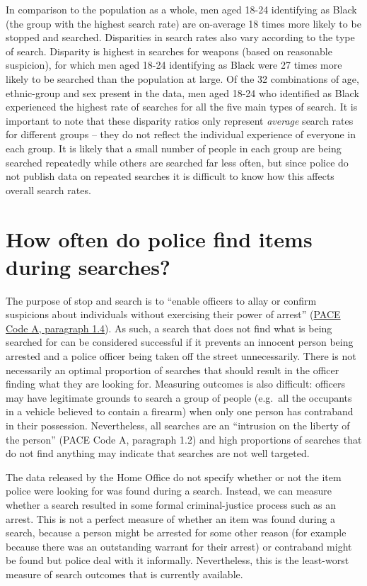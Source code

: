 \documentclass[
  a4paper,
  twoside, 11pt]{article}
\begin{document}
In comparison to the population as a whole, men aged 18-24 identifying as Black (the group with the highest search rate) are on-average 18 times more likely to be stopped and searched. Disparities in search rates also vary according to the type of search. Disparity is highest in searches for weapons (based on reasonable suspicion), for which men aged 18-24 identifying as Black were 27 times more likely to be searched than the population at large. Of the 32 combinations of age, ethnic-group and sex present in the data, men aged 18-24 who identified as Black experienced the highest rate of searches for all the five main types of search. It is important to note that these disparity ratios only represent \emph{average} search rates for different groups -- they do not reflect the individual experience of everyone in each group. It is likely that a small number of people in each group are being searched repeatedly while others are searched far less often, but since police do not publish data on repeated searches it is difficult to know how this affects overall search rates.

\hypertarget{how-often-do-police-find-items-during-searches}{%
\section{How often do police find items during searches?}\label{how-often-do-police-find-items-during-searches}}

The purpose of stop and search is to ``enable officers to allay or confirm suspicions about individuals without exercising their power of arrest'' (\href{https://www.gov.uk/guidance/police-and-criminal-evidence-act-1984-pace-codes-of-practice}{PACE Code A, paragraph 1.4}). As such, a search that does not find what is being searched for can be considered successful if it prevents an innocent person being arrested and a police officer being taken off the street unnecessarily. There is not necessarily an optimal proportion of searches that should result in the officer finding what they are looking for. Measuring outcomes is also difficult: officers may have legitimate grounds to search a group of people (e.g.~all the occupants in a vehicle believed to contain a firearm) when only one person has contraband in their possession. Nevertheless, all searches are an ``intrusion on the liberty of the person'' (PACE Code A, paragraph 1.2) and high proportions of searches that do not find anything may indicate that searches are not well targeted.

The data released by the Home Office do not specify whether or not the item police were looking for was found during a search. Instead, we can measure whether a search resulted in some formal criminal-justice process such as an arrest. This is not a perfect measure of whether an item was found during a search, because a person might be arrested for some other reason (for example because there was an outstanding warrant for their arrest) or contraband might be found but police deal with it informally. Nevertheless, this is the least-worst measure of search outcomes that is currently available.
\end{document}
